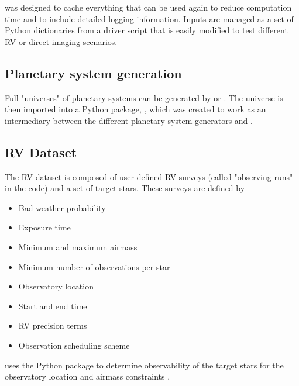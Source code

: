  was designed to cache everything that can be used again to
reduce computation time and to include detailed logging information. Inputs are
managed as a set of Python dictionaries from a driver script that is easily
modified to test different RV or direct imaging scenarios.

\subsection{Planetary system generation}

Full "universes" of planetary systems can be generated by  or
 \citep{starkExoVistaSuitePlanetary2022}. The universe is then
imported into a Python package, , which was created to work as
an intermediary between the different planetary system generators and
.

\subsection{RV Dataset}

The RV dataset is composed of user-defined RV surveys (called "observing runs"
in the code) and a set of target stars. These surveys are defined by
\begin{itemize}
  \item Bad weather probability
  \item Exposure time
  \item Minimum and maximum airmass
  \item Minimum number of observations per star
  \item Observatory location
  \item Start and end time
  \item RV precision terms
  \item Observation scheduling scheme
\end{itemize}
 uses the  Python package to
determine observability of the target stars for the observatory location and
airmass constraints \citep{morrisAstroplanOpen2018}. 


